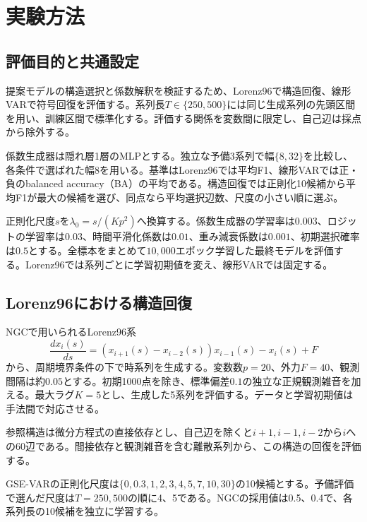 \section{実験方法}
\label{sec:experiments}
\subsection{評価目的と共通設定}
提案モデルの構造選択と係数解釈を検証するため、Lorenz96で構造回復、線形VARで符号回復を評価する。系列長\(T\in\{250,500\}\)には同じ生成系列の先頭区間を用い、訓練区間で標準化する。評価する関係を変数間に限定し、自己辺は採点から除外する。

係数生成器は隠れ層1層のMLPとする。独立な予備3系列で幅\(\{8,32\}\)を比較し、各条件で選ばれた幅8を用いる。基準はLorenz96では平均F1、線形VARでは正・負のbalanced accuracy（BA）の平均である。構造回復では正則化10候補から平均F1が最大の候補を選び、同点なら平均選択辺数、尺度の小さい順に選ぶ。

正則化尺度\(s\)を\(\lambda_0=s/(Kp^2)\)へ換算する。係数生成器の学習率は\(0.003\)、ロジットの学習率は\(0.03\)、時間平滑化係数は\(0.01\)、重み減衰係数は\(0.001\)、初期選択確率は\(0.5\)とする。全標本をまとめて\(10{,}000\)エポック学習した最終モデルを評価する。Lorenz96では系列ごとに学習初期値を変え、線形VARでは固定する。

\subsection{Lorenz96における構造回復}
NGCで用いられるLorenz96系\citep{tank2022}
\begin{equation}
 \frac{dx_i(s)}{ds}
 =\left(x_{i+1}(s)-x_{i-2}(s)\right)x_{i-1}(s)-x_i(s)+F
 \label{eq:lorenz}
\end{equation}
から、周期境界条件の下で時系列を生成する。変数数\(p=20\)、外力\(F=40\)、観測間隔は約\(0.05\)とする。初期1000点を除き、標準偏差\(0.1\)の独立な正規観測雑音を加える。最大ラグ\(K=5\)とし、生成した5系列を評価する。データと学習初期値は手法間で対応させる。

参照構造は微分方程式の直接依存とし、自己辺を除くと\(i+1,i-1,i-2\)から\(i\)への60辺である。間接依存と観測雑音を含む離散系列から、この構造の回復を評価する。

GSE-VARの正則化尺度は\(\{0,0.3,1,2,3,4,5,7,10,30\}\)の10候補とする。予備評価で選んだ尺度は\(T=250,500\)の順に4、5である。NGCの採用値は0.5、0.4で、各系列長の10候補を独立に学習する。

